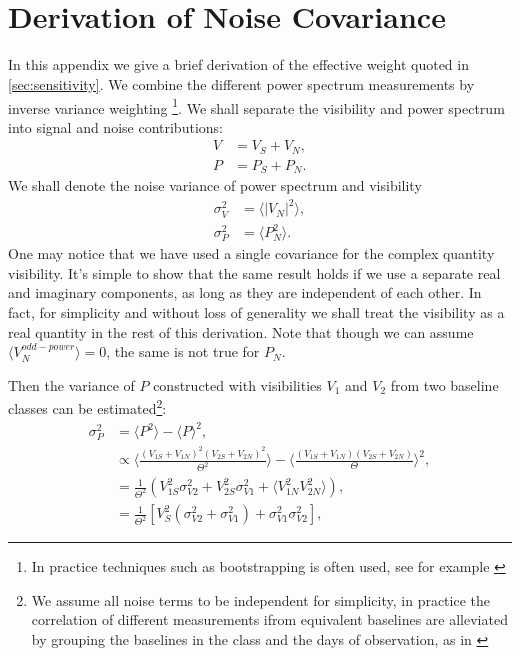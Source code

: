 \documentclass[twocolumn,apj,numberedappendix]{emulateapj}
\renewcommand\[{\begin{equation}}
\renewcommand\]{\end{equation}}
\begin{document}
\section{\label{sec:appB}\\Derivation of Noise Covariance \label{sec:appB}}
\label{sec:appB}
In this appendix we give a brief derivation of the effective weight quoted in \ref{sec:sensitivity}. We combine the different power spectrum measurements by inverse variance weighting \footnote{In practice techniques such as bootstrapping is often used, see for example \citep{Ali2015}}. We shall separate the visibility and power spectrum into signal and noise contributions:
\begin{equation}
\begin{aligned}
V &= V_S+V_N,\\
P &= P_S+P_N.
\end{aligned}
\end{equation}
We shall denote the noise variance of power spectrum and visibility
\begin{equation}
\begin{aligned}
\sigma_V^2 &= \langle |V_N|^2 \rangle,\\
\sigma_P^2 &= \langle P_N^2 \rangle.
\end{aligned}
\end{equation}
One may notice that we have used a single covariance for the complex quantity visibility. It's simple to show that the same result holds if we use a separate real and imaginary components, as long as they are independent of each other. In fact, for simplicity and without loss of generality we shall treat the visibility as a real quantity in the rest of this derivation. 
Note that though we can assume $\langle V_N^{odd-power}\rangle=0$, the same is not true for $P_N$. 

Then the variance of $P$ constructed with visibilities $V_1$ and $V_2$ from two baseline classes can be estimated\footnote{We assume all noise terms to be independent for simplicity, in practice the correlation of different measurements ifrom equivalent baselines are alleviated by grouping the baselines in the class and the days of observation, as in \cite{Ali2015}}:
\begin{equation}
\begin{aligned}
\sigma_P^2 &= \langle P^2\rangle -\langle P \rangle^2,\\
&\propto \langle \frac{(V_{1S}+V_{1N})^2 (V_{2S}+V_{2N})^2}{\Theta^2} \rangle - \langle \frac{(V_{1S}+V_{1N}) (V_{2S}+V_{2N})}{\Theta} \rangle ^2,\\
&= \frac{1}{\Theta^2} \left( V_{1S}^2\sigma_{V2}^2+V_{2S}^2\sigma_{V1}^2+\langle V_{1N}^2 V_{2N}^2\rangle\right), \\
&= \frac{1}{\Theta^2} \left[ V_{S}^2(\sigma_{V2}^2+\sigma_{V1}^2) + \sigma_{V1}^2 \sigma_{V2}^2\right], 
\end{aligned}
\end{equation}
\end{document}
